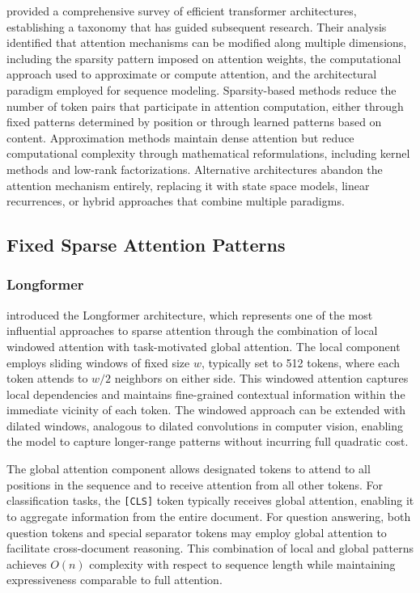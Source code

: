 \documentclass[11pt,letterpaper]{article}
\begin{document}
\cite{tay2020efficient} provided a comprehensive survey of efficient transformer architectures, establishing a taxonomy that has guided subsequent research. Their analysis identified that attention mechanisms can be modified along multiple dimensions, including the sparsity pattern imposed on attention weights, the computational approach used to approximate or compute attention, and the architectural paradigm employed for sequence modeling. Sparsity-based methods reduce the number of token pairs that participate in attention computation, either through fixed patterns determined by position or through learned patterns based on content. Approximation methods maintain dense attention but reduce computational complexity through mathematical reformulations, including kernel methods and low-rank factorizations. Alternative architectures abandon the attention mechanism entirely, replacing it with state space models, linear recurrences, or hybrid approaches that combine multiple paradigms.

\subsection{Fixed Sparse Attention Patterns}

\subsubsection{Longformer}

\cite{beltagy2020longformer} introduced the Longformer architecture, which represents one of the most influential approaches to sparse attention through the combination of local windowed attention with task-motivated global attention. The local component employs sliding windows of fixed size $w$, typically set to 512 tokens, where each token attends to $w/2$ neighbors on either side. This windowed attention captures local dependencies and maintains fine-grained contextual information within the immediate vicinity of each token. The windowed approach can be extended with dilated windows, analogous to dilated convolutions in computer vision, enabling the model to capture longer-range patterns without incurring full quadratic cost.

The global attention component allows designated tokens to attend to all positions in the sequence and to receive attention from all other tokens. For classification tasks, the \texttt{[CLS]} token typically receives global attention, enabling it to aggregate information from the entire document. For question answering, both question tokens and special separator tokens may employ global attention to facilitate cross-document reasoning. This combination of local and global patterns achieves $O(n)$ complexity with respect to sequence length while maintaining expressiveness comparable to full attention.
\end{document}
